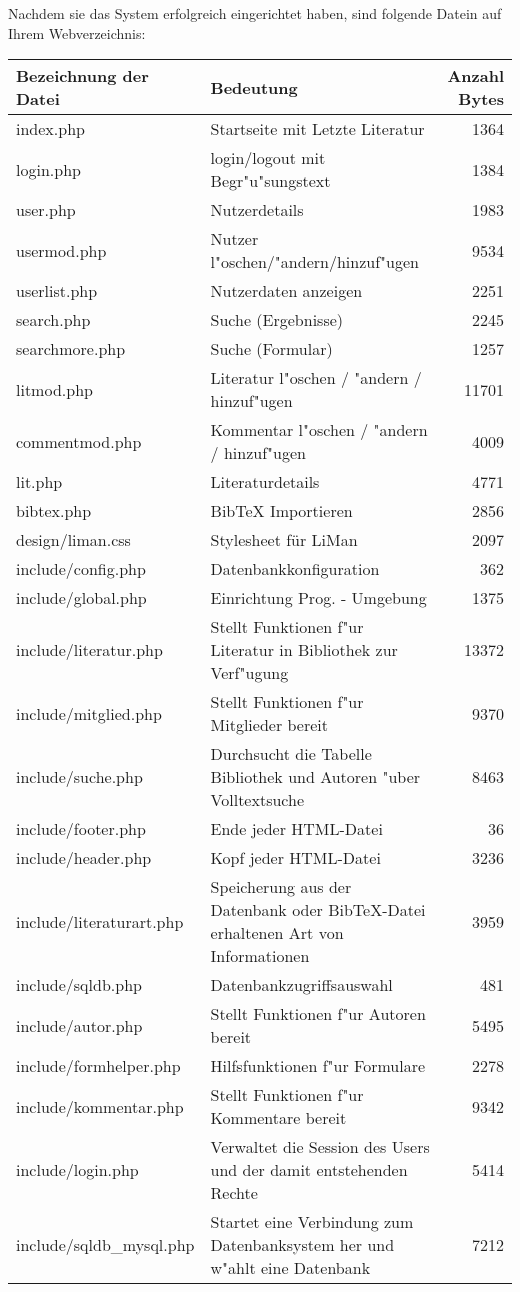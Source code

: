 Nachdem sie das System erfolgreich eingerichtet haben, sind folgende Datein auf Ihrem Webverzeichnis:

\begin{longtable}{|l|p{6cm}|r|}
\hline
{\bf Bezeichnung der Datei} & {\bf Bedeutung} & {\bf Anzahl Bytes}\\
\hline\hline
\endhead

index.php & Startseite mit Letzte Literatur & 1364\\
\hline
login.php & login/logout mit Begr"u"sungstext & 1384\\
\hline
user.php & Nutzerdetails & 1983\\
\hline
usermod.php & Nutzer l"oschen/"andern/hinzuf"ugen & 9534\\
\hline
userlist.php & Nutzerdaten anzeigen & 2251\\
\hline
search.php & Suche (Ergebnisse) & 2245\\
\hline
searchmore.php & Suche (Formular) & 1257\\
\hline
litmod.php & Literatur l"oschen / "andern / hinzuf"ugen & 11701\\
\hline
commentmod.php & Kommentar l"oschen / "andern / hinzuf"ugen & 4009\\
\hline
lit.php & Literaturdetails & 4771\\
\hline
bibtex.php & BibTeX Importieren & 2856\\
\hline
design/liman.css & Stylesheet für LiMan & 2097\\
\hline
include/config.php & Datenbankkonfiguration & 362\\
\hline
include/global.php & Einrichtung Prog. - Umgebung & 1375\\
\hline
include/literatur.php & Stellt Funktionen f"ur Literatur in Bibliothek zur Verf"ugung & 13372\\
\hline
include/mitglied.php & Stellt Funktionen f"ur Mitglieder bereit & 9370\\
\hline
include/suche.php & Durchsucht die Tabelle Bibliothek und Autoren "uber Volltextsuche & 8463\\
\hline
include/footer.php & Ende jeder HTML-Datei & 36 \\
\hline
include/header.php & Kopf jeder HTML-Datei & 3236 \\
\hline
include/literaturart.php & Speicherung aus der Datenbank oder BibTeX-Datei erhaltenen Art von Informationen & 3959\\
\hline
include/sqldb.php & Datenbankzugriffsauswahl & 481 \\
\hline
include/autor.php & Stellt Funktionen f"ur Autoren bereit & 5495\\
\hline
include/formhelper.php & Hilfsfunktionen f"ur Formulare & 2278\\
\hline
include/kommentar.php & Stellt Funktionen f"ur Kommentare bereit & 9342\\
\hline   
include/login.php &  Verwaltet die Session des Users und der damit entstehenden Rechte & 5414\\
\hline
include/sqldb\_mysql.php & Startet eine Verbindung zum Datenbanksystem her und w"ahlt eine Datenbank & 7212\\
\hline
\end{longtable}


